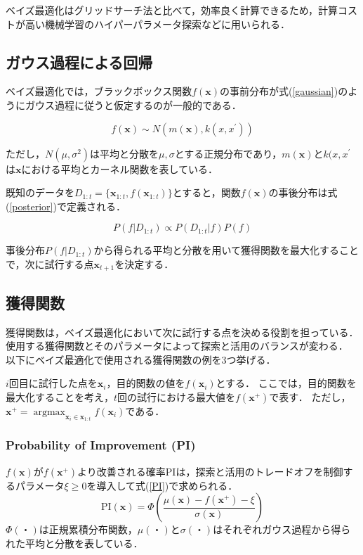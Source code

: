 \documentclass[a4paper,11pt]{jarticle}
\DeclareMathOperator*{\argmax}{argmax}
\begin{document}
ベイズ最適化はグリッドサーチ法と比べて，効率良く計算できるため，計算コストが高い機械学習のハイパーパラメータ探索などに用いられる．

\subsection{ガウス過程による回帰}
ベイズ最適化では，ブラックボックス関数$f(\mathbf{x})$の事前分布が式(\ref{gaussian})のようにガウス過程に従うと仮定するのが一般的である．

\begin{equation}
  f(\mathbf{x})\sim N(m(\mathbf{x}),k(x, x^{'})) \label{gaussian}
\end{equation}

ただし，$N(\mu,\sigma^2)$は平均と分散を$\mu, \sigma$とする正規分布であり，$m(\mathbf{x})$と$k(x, x^{'}$は$\mathbf{x}$における平均とカーネル関数を表している．

既知のデータを$D_{1:t}=\{\mathbf{x}_{1:t},f(\mathbf{x}_{1:t})\}$とすると，関数$f(\mathbf{x})$の事後分布は式(\ref{posterior})で定義される．

\begin{equation}
  P(f|D_{1:t})\propto P(D_{1:t}|f)P(f) \label{posterior}
\end{equation}

事後分布$P(f|D_{1:t})$から得られる平均と分散を用いて獲得関数を最大化することで，次に試行する点$\mathbf{x}_{t+1}$を決定する．

\subsection{獲得関数}
獲得関数は，ベイズ最適化において次に試行する点を決める役割を担っている．使用する獲得関数とそのパラメータによって探索と活用のバランスが変わる．
以下にベイズ最適化で使用される獲得関数の例を3つ挙げる．

$i$回目に試行した点を$\mathbf{x}_i$，目的関数の値を$f(\mathbf{x}_i)$とする．
ここでは，目的関数を最大化することを考え，$t$回の試行における最大値を$f(\mathbf{x}^+)$で表す．
ただし，$\mathbf{x}^+ = \argmax_{\mathbf{x}_i \in \mathbf{x}_{1:t}} f(\mathbf{x}_i)$である．

\subsubsection{Probability of Improvement (PI)}
$f(\mathbf{x})$が$f(\mathbf{x}^+)$より改善される確率PIは，探索と活用のトレードオフを制御するパラメータ$\xi\geq0$を導入して式(\ref{PI})で求められる．
\begin{equation}
  \text{PI}(\mathbf{x})=\Phi \left(\frac{\mu(\mathbf{x})-f(\mathbf{x}^+)-\xi}{\sigma(\mathbf{x})}\right) \label{PI}
\end{equation}
$\Phi(・)$は正規累積分布関数，$\mu(・)$と$\sigma(・)$はそれぞれガウス過程から得られた平均と分散を表している．
\end{document}
